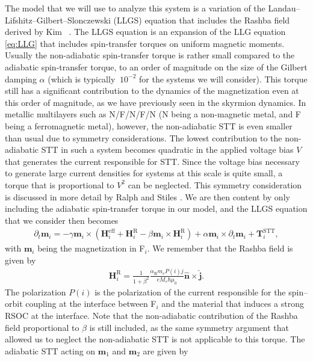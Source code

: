 The model that we will use to analyze this system is a variation of the Landau--Lifshitz--Gilbert--Slonczewski (LLGS) equation that includes the Rashba field derived by Kim \etal~\cite{Kim2012}. The LLGS equation is an expansion of the LLG equation \eqref{eq:LLG} that includes spin-transfer torques on uniform magnetic moments. Usually the non-adiabatic spin-transfer torque is rather small compared to the adiabatic spin-transfer torque, to an order of magnitude on the size of the Gilbert damping $\alpha$ (which is typically $~10^{-2}$ for the systems we will consider). This torque still has a significant contribution to the dynamics of the magnetization even at this order of magnitude, as we have previously seen in the skyrmion dynamics. In metallic multilayers such as N/F/N/F/N (N being a non-magnetic metal, and F being a ferromagnetic metal), however, the non-adiabatic STT is even smaller than usual due to symmetry considerations. The lowest contribution to the non-adiabatic STT in such a system becomes quadratic in the applied voltage bias $V$ that generates the current responsible for STT. Since the voltage bias necessary to generate large current densities for systems at this scale is quite small, a torque that is proportional to $V^2$ can be neglected. This symmetry consideration is discussed in more detail by Ralph and Stiles \cite{Ralph2008}. We are then content by only including the adiabatic spin-transfer torque in our model, and the LLGS equation that we consider then becomes
\begin{align}
    \label{eq:LLGS}
    \partial_t \mathbold{m}_i = -\gamma \mathbold{m}_i\times\left(\mathbold{H}^{\text{eff}}_i+\mathbold{H}^{\text{R}}_i - \beta\mathbold{m}_i\times\mathbold{H}^{\text{R}}_i\right) + \alpha\mathbold{m}_i \times\partial_t\mathbold{m}_i + \mathbold{T}^{\text{STT}}_i,
\end{align}
with $\mathbold{m}_i$ being the magnetization in F$_i$. We remember that the Rashba field is given by
\begin{align}
    \mathbold{H}^{\text{R}}_i = \frac{1}{1+\beta^2}\frac{\alpha_{\text{R}}m_e P(i) j}{e M_s \hbar \mu_0} \mathbold{\hat{n}}\times\mathbold{\hat{j}}.
\end{align}
The polarization $P(i)$ is the polarization of the current responsible for the spin--orbit coupling at the interface between F$_i$ and the material that induces a strong RSOC at the interface. Note that the non-adiabatic contribution of the Rashba field proportional to $\beta$ is still included, as the same symmetry argument that allowed us to neglect the non-adiabatic STT is not applicable to this torque. The adiabatic STT acting on $\mathbold{m}_1$ and $\mathbold{m}_2$ are given by
